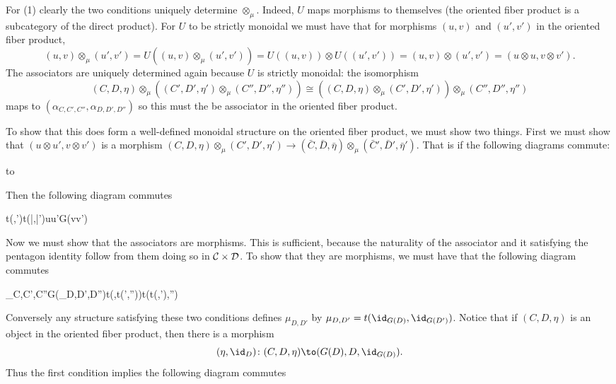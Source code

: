 \eprop

\bproof

    For (1) clearly the two conditions uniquely determine $\otimes_\mu$.
    Indeed, $U$ maps morphisms to themselves (the oriented fiber product is a subcategory of the direct product).
    For $U$ to be strictly monoidal we must have that for morphisms $(u,v)$ and $(u',v')$ in the oriented fiber product,
    $$ (u,v)\otimes_\mu(u',v') = U((u,v) \otimes_\mu (u',v')) = U((u,v)) \otimes U((u',v')) = (u,v) \otimes (u',v') = (u\otimes u,v\otimes v') . $$
    The associators are uniquely determined again because $U$ is strictly monoidal: the isomorphism
    $$ (C,D,\eta)\otimes_\mu((C',D',\eta')\otimes_\mu(C'',D'',\eta'')) \cong ((C,D,\eta)\otimes_\mu(C',D',\eta'))\otimes_\mu(C'',D'',\eta'') $$
    maps to $(\alpha_{C,C',C''},\alpha_{D,D',D''})$ so this must the be associator in the oriented fiber product.

    To show that this does form a well-defined monoidal structure on the oriented fiber product, we must show two things.
    First we must show that $(u\otimes u',v\otimes v')$ is a morphism $(C,D,\eta)\otimes_\mu(C',D',\eta')\to(\bar C,\bar D,\bar\eta)\otimes_\mu(\bar C',\bar D',\bar\eta')$.
    That is if the following diagrams commute:

    \medskip
    \hbox to

    Then the following diagram commutes

        {t(\eta,\eta')}{t(\bar\eta,\bar\eta')}{u\otimes u'}{G(v\otimes v')}

    Now we must show that the associators are morphisms.
    This is sufficient, because the naturality of the associator and it satisfying the pentagon identity follow from them doing so in ${{\cal C}}\times{{\cal D}}$.
    To show that they are morphisms, we must have that the following diagram commutes

        {\alpha_{C,C',C''}}{G(\alpha_{D,D',D''})}{t(\eta,t(\eta',\eta''))}{t(t(\eta,\eta'),\eta'')}

    Conversely any structure satisfying these two conditions defines $\mu_{D,D'}$ by $\mu_{D,D'}=t(\id_{G(D)},\id_{G(D')})$.
    Notice that if $(C,D,\eta)$ is an object in the oriented fiber product, then there is a morphism
    $$ (\eta,\id_D) \colon (C,D,\eta) \to (G(D),D,\id_{G(D)}) . $$
    Thus the first condition implies the following diagram commutes


